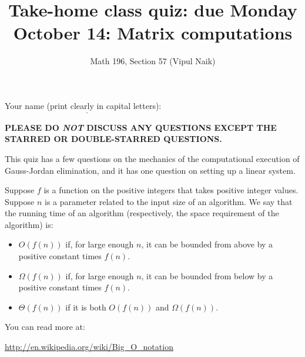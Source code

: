 \documentclass[10pt]{amsart}
\title{Take-home class quiz: due Monday October 14: Matrix computations}
\author{Math 196, Section 57 (Vipul Naik)}
\begin{document}
\maketitle

Your name (print clearly in capital letters): $\underline{\qquad\qquad\qquad\qquad\qquad\qquad\qquad\qquad\qquad\qquad}$

{\bf PLEASE DO {\em NOT} DISCUSS ANY QUESTIONS EXCEPT THE STARRED OR DOUBLE-STARRED QUESTIONS.}

This quiz has a few questions on the mechanics of the computational
execution of Gauss-Jordan elimination, and it has one question on
setting up a linear system.

Suppose $f$ is a function on the positive integers that takes positive
integer values. Suppose $n$ is a parameter related to the input size
of an algorithm. We say that the running time of an algorithm
(respectively, the space requirement of the algorithm) is:

\begin{itemize}
\item $O(f(n))$ if, for large enough $n$, it can be bounded from above
  by a positive constant times $f(n)$.
\item $\Omega(f(n))$ if, for large enough $n$, it can be bounded from
  below by a positive constant times $f(n)$.
\item $\Theta(f(n))$ if it is both $O(f(n))$ and $\Omega(f(n))$.
\end{itemize}

You can read more at:

\url{http://en.wikipedia.org/wiki/Big_O_notation}
\end{document}

